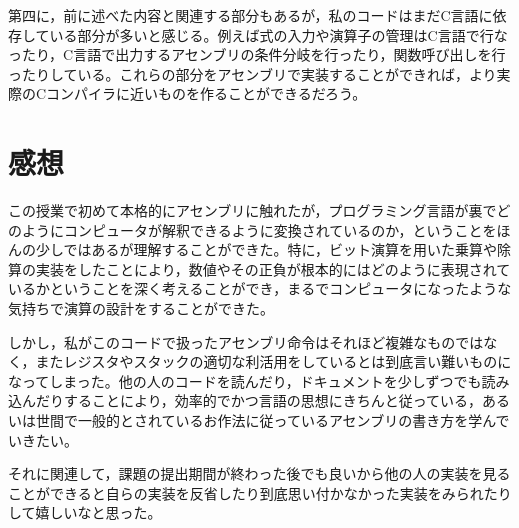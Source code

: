 \documentclass[a4paper]{jsarticle}
\begin{document}
第四に，前に述べた内容と関連する部分もあるが，私のコードはまだC言語に依存している部分が多いと感じる。例えば式の入力や演算子の管理はC言語で行なったり，C言語で出力するアセンブリの条件分岐を行ったり，関数呼び出しを行ったりしている。これらの部分をアセンブリで実装することができれば，より実際のCコンパイラに近いものを作ることができるだろう。



\section{感想}
この授業で初めて本格的にアセンブリに触れたが，プログラミング言語が裏でどのようにコンピュータが解釈できるように変換されているのか，ということをほんの少しではあるが理解することができた。特に，ビット演算を用いた乗算や除算の実装をしたことにより，数値やその正負が根本的にはどのように表現されているかということを深く考えることができ，まるでコンピュータになったような気持ちで演算の設計をすることができた。

しかし，私がこのコードで扱ったアセンブリ命令はそれほど複雑なものではなく，またレジスタやスタックの適切な利活用をしているとは到底言い難いものになってしまった。他の人のコードを読んだり，ドキュメントを少しずつでも読み込んだりすることにより，効率的でかつ言語の思想にきちんと従っている，あるいは世間で一般的とされているお作法に従っているアセンブリの書き方を学んでいきたい。

それに関連して，課題の提出期間が終わった後でも良いから他の人の実装を見ることができると自らの実装を反省したり到底思い付かなかった実装をみられたりして嬉しいなと思った。
\end{document}
